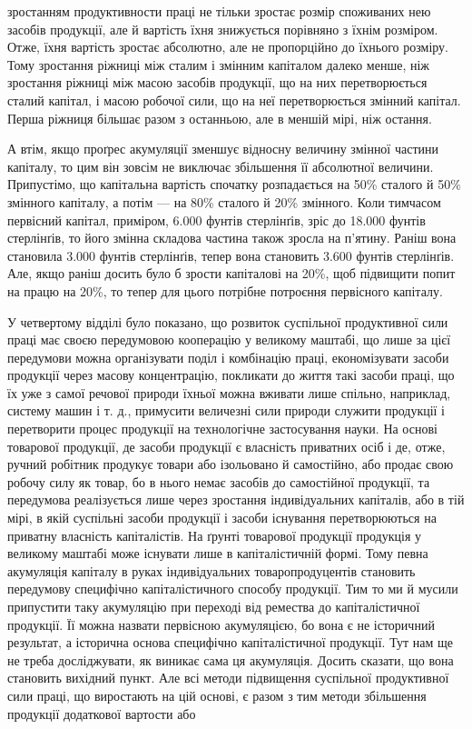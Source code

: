 \parcont{}  %
зростанням продуктивности праці не тільки зростає розмір споживаних
нею засобів продукції, але й вартість їхня знижується
порівняно з їхнім розміром. Отже, їхня вартість зростає абсолютно,
але не пропорційно до їхнього розміру. Тому зростання
ріжниці між сталим і змінним капіталом далеко менше, ніж зростання
ріжниці між масою засобів продукції, що на них перетворюється
сталий капітал, і масою робочої сили, що на неї перетворюється
змінний капітал. Перша ріжниця більшає разом з останньою,
але в меншій мірі, ніж остання.

А втім, якщо проґрес акумуляції зменшує відносну величину
змінної частини капіталу, то цим він зовсім не виключає збільшення
її абсолютної величини. Припустімо, що капітальна вартість спочатку
розпадається на 50\% сталого й 50\% змінного капіталу,
а потім — на 80\% сталого й 20\% змінного. Коли тимчасом первісний
капітал, приміром, 6.000 фунтів стерлінґів, зріс до 18.000
фунтів стерлінґів, то його змінна складова частина також зросла
на п’ятину. Раніш вона становила 3.000 фунтів стерлінґів, тепер
вона становить 3.600 фунтів стерлінґів. Але, якщо раніш
досить було б зрости капіталові на 20\%, щоб підвищити попит
на працю на 20\%, то тепер для цього потрібне потроєння первісного
капіталу.

У четвертому відділі було показано, що розвиток суспільної
продуктивної сили праці має своєю передумовою кооперацію у
великому маштабі, що лише за цієї передумови можна організувати
поділ і комбінацію праці, економізувати засоби продукції
через масову концентрацію, покликати до життя такі засоби
праці, що їх уже з самої речової природи їхньої можна вживати
лише спільно, наприклад, систему машин і т. д., примусити величезні
сили природи служити продукції і перетворити процес продукції
на технологічне застосування науки. На основі товарової
продукції, де засоби продукції є власність приватних осіб і де,
отже, ручний робітник продукує товари або ізольовано й самостійно,
або продає свою робочу силу як товар, бо в нього немає
засобів до самостійної продукції, та передумова реалізується
лише через зростання індивідуальних капіталів, або в тій мірі,
в якій суспільні засоби продукції і засоби існування перетворюються
на приватну власність капіталістів. На ґрунті товарової
продукції продукція у великому маштабі може існувати лише в
капіталістичній формі. Тому певна акумуляція капіталу в руках
індивідуальних товаропродуцентів становить передумову специфічно
капіталістичного способу продукції. Тим то ми й мусили
припустити таку акумуляцію при переході від ремества до капіталістичної
продукції. Її можна назвати первісною акумуляцією,
бо вона є не історичний результат, а історична основа специфічно
капіталістичної продукції. Тут нам ще не треба досліджувати,
як виникає сама ця акумуляція. Досить сказати, що вона становить
вихідний пункт. Але всі методи підвищення суспільної
продуктивної сили праці, що виростають на цій основі, є разом
з тим методи збільшення продукції додаткової вартости або
\parbreak{}  %
